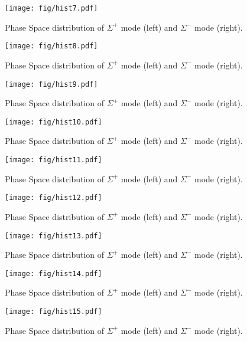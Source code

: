 \begin{figure}
\texttt{[image: fig/hist7.pdf]}
\caption{Phase Space distribution of $\Sigma^+$ mode (left) and $\Sigma^-$ mode (right).}
\end{figure}

\begin{figure}
\texttt{[image: fig/hist8.pdf]}
\caption{Phase Space distribution of $\Sigma^+$ mode (left) and $\Sigma^-$ mode (right).}
\end{figure}

\begin{figure}
\texttt{[image: fig/hist9.pdf]}
\caption{Phase Space distribution of $\Sigma^+$ mode (left) and $\Sigma^-$ mode (right).}
\end{figure}

\begin{figure}
\texttt{[image: fig/hist10.pdf]}
\caption{Phase Space distribution of $\Sigma^+$ mode (left) and $\Sigma^-$ mode (right).}
\end{figure}

\begin{figure}
\texttt{[image: fig/hist11.pdf]}
\caption{Phase Space distribution of $\Sigma^+$ mode (left) and $\Sigma^-$ mode (right).}
\end{figure}

\begin{figure}
\texttt{[image: fig/hist12.pdf]}
\caption{Phase Space distribution of $\Sigma^+$ mode (left) and $\Sigma^-$ mode (right).}
\end{figure}

\begin{figure}
\texttt{[image: fig/hist13.pdf]}
\caption{Phase Space distribution of $\Sigma^+$ mode (left) and $\Sigma^-$ mode (right).}
\end{figure}

\begin{figure}
\texttt{[image: fig/hist14.pdf]}
\caption{Phase Space distribution of $\Sigma^+$ mode (left) and $\Sigma^-$ mode (right).}
\end{figure}

\begin{figure}
\texttt{[image: fig/hist15.pdf]}
\caption{Phase Space distribution of $\Sigma^+$ mode (left) and $\Sigma^-$ mode (right).}
\end{figure}

